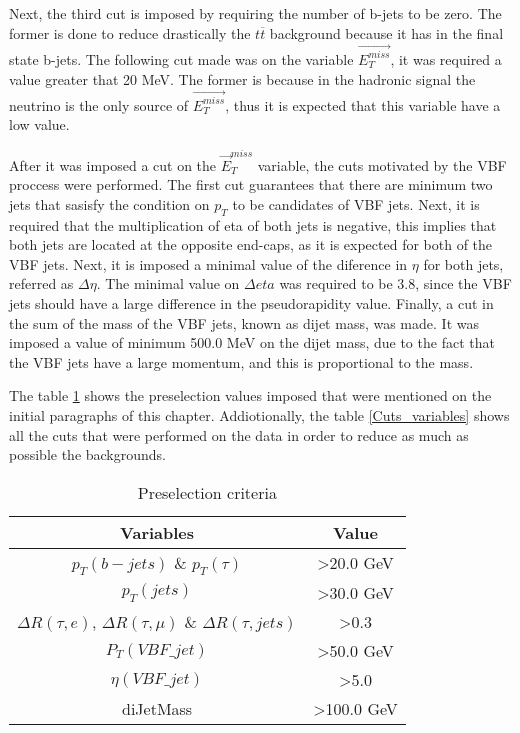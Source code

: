 Next, the third cut is imposed by requiring the number of b-jets to be zero. The former is done to reduce drastically the $t\overline{t}$ background because it has in the final state b-jets. The following cut made was on the variable $\vec{E_T^{miss}}$, it was required a value greater that 20 MeV. The former is because in the hadronic signal the neutrino is the only source of $\vec{E_T^{miss}}$, thus it is expected that this variable have a low value.
  
After it was imposed a cut on the $\vec{E}_T^{miss}$ variable, the cuts motivated by the VBF proccess were performed. The first cut guarantees that there are minimum two jets that sasisfy the condition on $p_T$ to be candidates of VBF jets. Next, it is required that the multiplication of eta of both jets is negative, this implies that both jets are located at the opposite end-caps, as it is expected for both of the VBF jets. Next, it is imposed a minimal value of the diference in $\eta$ for both jets, referred as $\Delta \eta$. The minimal value on $\Delta eta$ was required to be 3.8, since the VBF jets should have a large difference in the pseudorapidity value. Finally, a cut in the sum of the mass of the VBF jets, known as dijet mass, was made. It was imposed a value of minimum 500.0 MeV on the dijet mass, due to the fact that the VBF jets have a large momentum, and this is proportional to the mass.  

The table \ref{preselection_table} shows the preselection values imposed that were mentioned on the initial paragraphs of this chapter. Addiotionally, the table \ref{Cuts_variables} shows all the cuts that were performed on the data in order to reduce as much as possible the backgrounds. 

\begin{table}[h]
\centering
\caption{Preselection criteria}
\label{preselection_table}
\begin{tabular}{|c|c|}
\hline
Variables                                                                & Value                 \\ \hline
$p_T(b-jets)$ \& $p_T(\tau)$                                            & \textgreater 20.0 GeV \\ \hline
$p_T(jets)$                                                             & \textgreater 30.0 GeV  \\ \hline
$\Delta R (\tau, e)$, $\Delta R (\tau, \mu)$ \& $\Delta R (\tau, jets)$ & \textgreater 0.3      \\ \hline
$P_T(VBF\_jet)$                                                          & \textgreater 50.0 GeV \\ \hline
$\eta(VBF\_jet)$                                                         & \textgreater5.0       \\ \hline
diJetMass                                                               & \textgreater100.0 GeV \\ \hline
\end{tabular}
\end{table}

